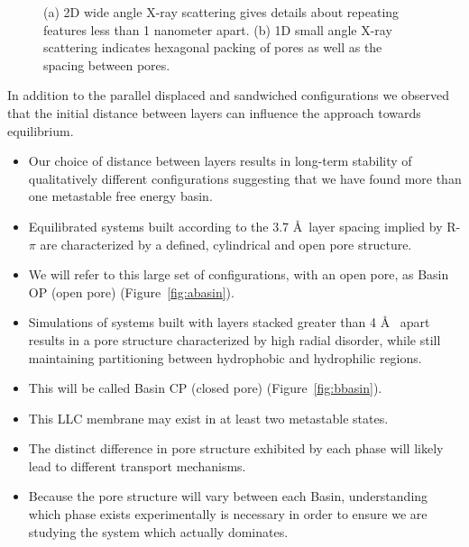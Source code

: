 \documentclass{article}
\newcommand{\angstrom}{\textup{\AA}}
\begin{document}
\begin{figure}[!ht]
\begin{subfigure}[t]{0.43\linewidth}
		\caption{}\label{fig:SAXS}
	\end{subfigure}
	\caption{(a) 2D wide angle X-ray scattering gives details about repeating
	features less than 1 nanometer apart. (b) 1D small angle X-ray scattering 
	indicates hexagonal packing of pores as well as the spacing between pores.}\label{fig:SWAXS}
  \end{figure}

  In addition to the parallel displaced and sandwiched configurations we observed
  that the initial distance between layers can influence the approach towards 
  equilibrium.
  \begin{itemize}
  	\item Our choice of distance between layers results in long-term stability of 
	qualitatively different configurations suggesting that we have found more than
        one metastable free energy basin.
  	\item Equilibrated systems built according to the 3.7 \angstrom~layer spacing 
        implied by R-$\pi$ are characterized by a defined, cylindrical and open pore 
	structure.
        \item We will refer to this large set of configurations, with an open pore, as 
        Basin OP (open pore) (Figure~\ref{fig:abasin}).
	\item Simulations of systems built with layers stacked greater than 4 
	\angstrom~ apart results in a pore structure characterized by high radial 
	disorder, while still maintaining partitioning between hydrophobic and 
	hydrophilic regions.
	\item This will be called Basin CP (closed pore) (Figure~\ref{fig:bbasin}).
	\item This LLC membrane may exist in at least two metastable states.
	\item The distinct difference in pore structure exhibited by each phase will 
	likely lead to different transport mechanisms.
	\item Because the pore structure will vary between each Basin, understanding 
	which phase exists experimentally is necessary in order to ensure we are 
	studying the system which actually dominates.
  \end{itemize}
  
\end{document}
